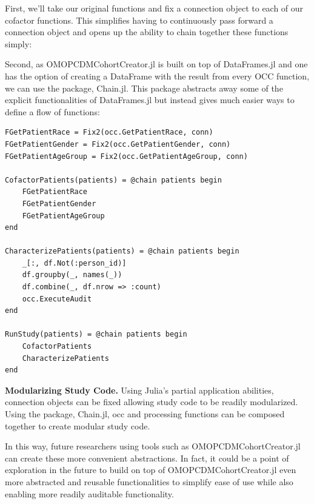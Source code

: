 \documentclass{juliacon}
\begin{document}
First, we'll take our original functions and fix a connection object to each of our cofactor functions.
This simplifies having to continuously pass forward a connection object and opens up the ability to chain together these functions simply:

Second, as OMOPCDMCohortCreator.jl is built on top of DataFrames.jl and one has the option of creating a DataFrame with the result from every OCC function, we can use the package, Chain.jl.
This package abstracts away some of the explicit functionalities of DataFrames.jl but instead gives much easier ways to define a flow of functions:

\begin{listing}[!ht]
\begin{verbatim}
FGetPatientRace = Fix2(occ.GetPatientRace, conn)
FGetPatientGender = Fix2(occ.GetPatientGender, conn)
FGetPatientAgeGroup = Fix2(occ.GetPatientAgeGroup, conn)

CofactorPatients(patients) = @chain patients begin
    FGetPatientRace
    FGetPatientGender
    FGetPatientAgeGroup
end

CharacterizePatients(patients) = @chain patients begin
    _[:, df.Not(:person_id)]
    df.groupby(_, names(_))
    df.combine(_, df.nrow => :count)
    occ.ExecuteAudit
end

RunStudy(patients) = @chain patients begin
    CofactorPatients
    CharacterizePatients
end
\end{verbatim}
\caption{\textbf{Modularizing Study Code.} Using Julia's partial application abilities, connection objects can be fixed allowing study code to be readily modularized. Using the package, Chain.jl, occ and processing functions can be composed together to create modular study code.}
\label{listing:modular_study}
\end{listing}

In this way, future researchers using tools such as OMOPCDMCohortCreator.jl can create these more convenient abstractions.
In fact, it could be a point of exploration in the future to build on top of OMOPCDMCohortCreator.jl even more abstracted and reusable functionalities to simplify ease of use while also enabling more readily auditable functionality.
\end{document}
